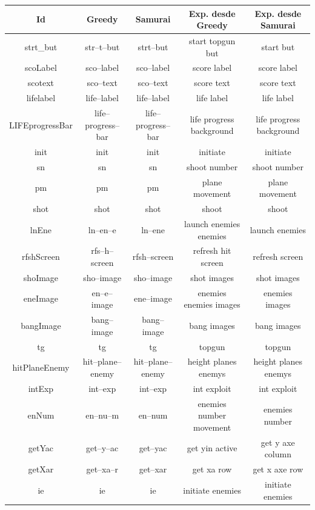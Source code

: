 \begin{table}
		\centering
   		\begin{tabular}{| c | c | c | c | c |}     
   		
       \hline
  	   \textbf{Id} & \textbf{Greedy} & \textbf{Samurai} & \textbf{Exp. desde Greedy} & \textbf{Exp. desde Samurai} \\ \hline
strt\_but&str--t--but&strt--but&start topgun but&start but\\ \hline
scoLabel&sco--label&sco--label&score label&score label\\ \hline
scotext&sco--text&sco--text&score text&score text\\ \hline
lifelabel&life--label&life--label&life label&life label\\ \hline
LIFEprogressBar&life--progress--bar&life--progress--bar&life progress background&life progress background\\ \hline
init&init&init&initiate&initiate\\ \hline
sn&sn&sn&shoot number&shoot number\\ \hline
pm&pm&pm&plane movement&plane movement\\ \hline
shot&shot&shot&shoot&shoot\\ \hline
lnEne&ln--en--e&ln--ene&launch enemies enemies&launch enemies\\ \hline
rfshScreen&rfs--h--screen&rfsh--screen&refresh hit screen&refresh screen\\ \hline
shoImage&sho--image&sho--image&shot images&shot images\\ \hline
eneImage&en--e--image&ene--image&enemies enemies images&enemies images\\ \hline
bangImage&bang--image&bang--image&bang images&bang images\\ \hline
tg&tg&tg&topgun&topgun\\ \hline
hitPlaneEnemy&hit--plane--enemy&hit--plane--enemy&height planes enemys&height planes enemys\\ \hline
intExp&int--exp&int--exp&int exploit&int exploit\\ \hline
enNum&en--nu--m&en--num&enemies number movement&enemies number\\ \hline
getYac&get--y--ac&get--yac&get yin active&get y axe column\\ \hline
getXar&get--xa--r&get--xar&get xa row&get x axe row\\ \hline
ie&ie&ie&initiate enemies&initiate enemies\\ \hline

\end{tabular}
\end{table}
